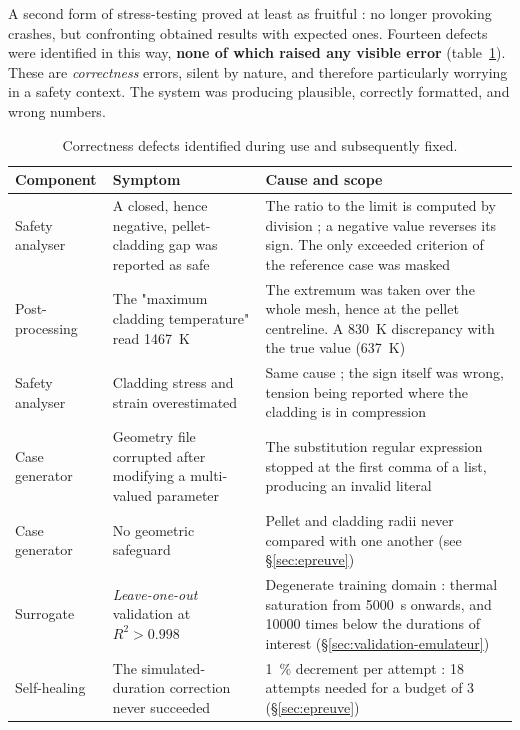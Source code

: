 \documentclass[12pt,a4paper]{report}
\begin{document}
A second form of stress-testing proved at least as fruitful : no longer
provoking crashes, but confronting obtained results with expected ones. Fourteen
defects were identified in this way, \textbf{none of which raised any visible
error} (table~\ref{tab:bugs}). These are \textit{correctness} errors, silent by
nature, and therefore particularly worrying in a safety context. The system was
producing plausible, correctly formatted, and wrong numbers.
\begin{table}[htbp]
\centering
\caption[Correctness defects identified]{Correctness defects identified during
use and subsequently fixed.}
\label{tab:bugs}
\small
\begin{tabularx}{\textwidth}{@{}>{\raggedright\arraybackslash}p{3.3cm}XX@{}}
\toprule
\textbf{Component} & \textbf{Symptom} & \textbf{Cause and scope}\\
\midrule
Safety analyser & A closed, hence negative, pellet-cladding gap was reported as
  safe & The ratio to the limit is computed by division ; a negative value
  reverses its sign. The only exceeded criterion of the reference case was
  masked\\
\addlinespace
Post-processing & The "maximum cladding temperature" read
  \SI{1467}{\kelvin} & The extremum was taken over the whole mesh, hence at the
  pellet centreline. A \SI{830}{\kelvin} discrepancy with the true value
  (\SI{637}{\kelvin})\\
\addlinespace
Safety analyser & Cladding stress and strain overestimated & Same cause ; the
  sign itself was wrong, tension being reported where the cladding is in
  compression\\
\addlinespace
Case generator & Geometry file corrupted after modifying a multi-valued
  parameter & The substitution regular expression stopped at the first comma of
  a list, producing an invalid literal\\
\addlinespace
Case generator & No geometric safeguard & Pellet and cladding radii never
  compared with one another (see §\ref{sec:epreuve})\\
\addlinespace
Surrogate & \textit{Leave-one-out} validation at $R^2 > 0.998$ & Degenerate
  training domain : thermal saturation from \SI{5000}{\second} onwards, and
  \num{10000} times below the durations of interest
  (§\ref{sec:validation-emulateur})\\
\addlinespace
Self-healing & The simulated-duration correction never succeeded &
  \SI{1}{\percent} decrement per attempt : \num{18} attempts needed for a budget
  of \num{3} (§\ref{sec:epreuve})\\

\end{tabularx}
\end{table}
\end{document}
